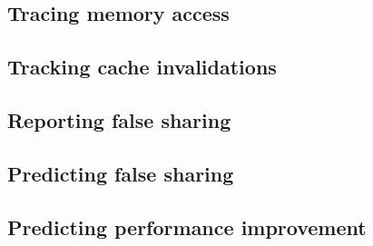 \subsection{Tracing memory access}
\subsection{Tracking cache invalidations}
\subsection{Reporting false sharing}
\subsection{Predicting false sharing}
\subsection{Predicting performance improvement}